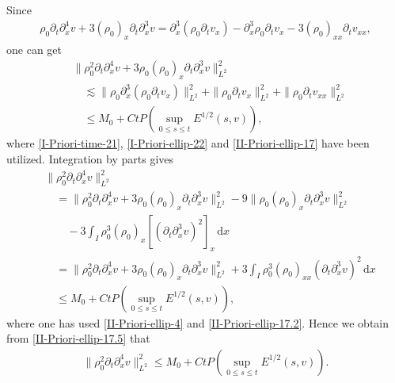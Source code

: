 \documentclass[11pt, reqno]{amsart}
\newcommand{\diff}{\mathrm{d}}
\numberwithin{equation}{section}
\begin{document}
{Since
\begin{equation*}
\begin{aligned}
\rho_0\partial_t\partial_x^4v+3(\rho_0)_{x}\partial_t\partial_x^3v=
\partial_x^3(\rho_0\partial_tv_x)-\partial_x^3\rho_0\partial_tv_x-3(\rho_0)_{xx}\partial_tv_{xx},
\end{aligned}
\end{equation*}
one can get
\begin{equation}\label{II-Priori-ellip-17.2}
\begin{aligned}
&\|\rho_0^2\partial_t\partial_x^4v+3\rho_0(\rho_0)_{x}\partial_t\partial_x^3v\|_{L^2}^2\\
&\quad\lesssim \|\rho_0\partial_x^3(\rho_0\partial_tv_x)\|_{L^2}^2+\|\rho_0\partial_tv_x\|_{L^2}^2+\|\rho_0\partial_tv_{xx}\|_{L^2}^2\\
&\quad\leq M_0+Ct P(\sup_{0\leq s\leq t}E^{1/2}(s,v)),
\end{aligned}
\end{equation}
where \eqref{I-Priori-time-21}, \eqref{I-Priori-ellip-22} and \eqref{II-Priori-ellip-17} have been utilized.
Integration by parts gives
\begin{equation}\label{II-Priori-ellip-17.5}
\begin{aligned}
&\|\rho_0^2\partial_t\partial_x^4v\|_{L^2}^2\\
&\quad=\|\rho_0^2\partial_t\partial_x^4v+3\rho_0(\rho_0)_{x}\partial_t\partial_x^3v\|_{L^2}^2
-9\|\rho_0(\rho_0)_{x}\partial_t\partial_x^3v\|_{L^2}^2\\
&\qquad-3\int_I\rho_0^3(\rho_0)_x[(\partial_t\partial_x^3v)^2]_x\,\diff x\\
&\quad=\|\rho_0^2\partial_t\partial_x^4v+3\rho_0(\rho_0)_{x}\partial_t\partial_x^3v\|_{L^2}^2
+3\int_I\rho_0^3(\rho_0)_{xx}(\partial_t\partial_x^3v)^2\,\diff x\\
&\quad\leq M_0+Ct P(\sup_{0\leq s\leq t}E^{1/2}(s,v)),
\end{aligned}
\end{equation}
where one has used \eqref{II-Priori-ellip-4} and \eqref{II-Priori-ellip-17.2}.
Hence we obtain from \eqref{II-Priori-ellip-17.5} that
\begin{equation}\label{II-Priori-ellip-18}
\begin{aligned}
\|\rho_0^2\partial_t\partial_x^4v\|_{L^2}^2
\leq M_0+Ct P(\sup_{0\leq s\leq t}E^{1/2}(s,v)).
\end{aligned}
\end{equation}



}
\end{document}
